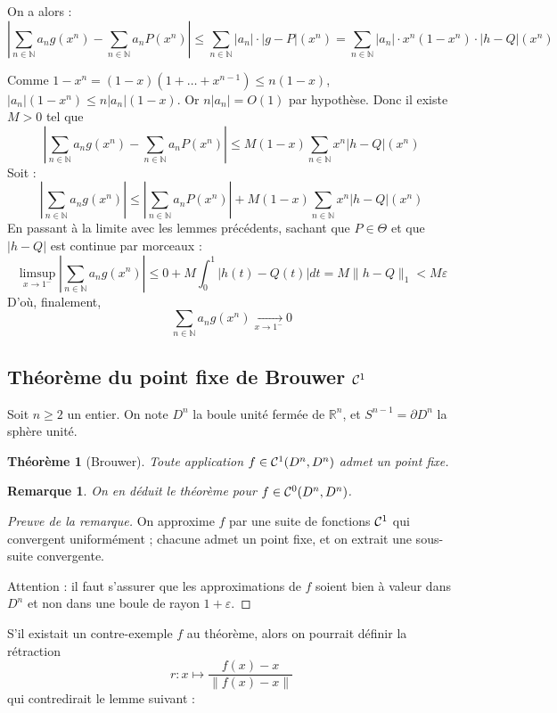 \documentclass[a4paper, 11pt]{article}
\def\N{\mathbb{N}}
\def\R{\mathbb{R}}
\def\Cf{{\cal{C}}}
\newtheorem*{theorem}{Théorème}
\newtheorem*{remark}{Remarque}
\begin{document}
On a alors :
\[ \left| \sum_{n \in \N} a_n g(x^n) - \sum_{n \in \N} a_n P(x^n) \right| \leq
  \sum_{n \in \N} |a_n| \cdot |g - P|(x^n) = \sum_{n \in \N} |a_n| \cdot
  x^n(1-x^n) \cdot |h - Q|(x^n) \]

Comme $1-x^n = (1-x)(1+ \ldots + x^{n-1}) \leq n(1-x)$, $|a_n|(1-x^n) \leq
n|a_n|(1-x)$. Or $n|a_n| = O(1)$ par hypothèse. Donc il existe $M > 0$ tel que
\[ \left| \sum_{n \in \N} a_n g(x^n) - \sum_{n \in \N} a_n P(x^n) \right| \leq
  M (1-x) \sum_{n \in \N} x^n|h - Q|(x^n) \]
Soit :
\[ \left| \sum_{n \in \N} a_n g(x^n) \right| \leq
  \left| \sum_{n \in \N} a_n P(x^n) \right| +
  M (1-x) \sum_{n \in \N} x^n|h - Q|(x^n) \]
En passant à la limite avec les lemmes précédents, sachant que $P \in \Theta$ et
que $|h-Q|$ est continue par morceaux :
\[ \limsup_{x \to 1^-} \left| \sum_{n \in \N} a_n g(x^n) \right| \leq
  0 + M \int_0^1 |h(t) - Q(t)|dt = M \|h-Q\|_1 < M\varepsilon \]
D'où, finalement,
\[ \sum_{n \in \N} a_n g(x^n) \xrightarrow[x \to 1^-]{} 0 \]

\newpage


\subsection{Théorème du point fixe de Brouwer $\Cf^1$}

Soit $n \geq 2$ un entier. On note $D^n$ la boule unité fermée de $\R^n$, et
$S^{n-1} = \partial D^n$ la sphère unité.

\begin{theorem}[Brouwer]
  Toute application $f \in \Cf^1(D^n, D^n)$ admet un point fixe.
\end{theorem}

\begin{remark}
  On en déduit le théorème pour $f \in \Cf^0(D^n, D^n)$.
\end{remark}
\begin{proof}[Preuve de la remarque]
  On approxime $f$ par une suite de fonctions $\Cf^1$ qui convergent
  uniformément ; chacune admet un point fixe, et on extrait une sous-suite
  convergente.

  Attention : il faut s'assurer que les approximations de $f$ soient bien à
  valeur dans $D^n$ et non dans une boule de rayon $1+\varepsilon$.
\end{proof}

S'il existait un contre-exemple $f$ au théorème, alors on pourrait définir la
rétraction
\[ r : x \mapsto \frac{f(x) - x}{\|f(x) - x\|}\]
qui contredirait le lemme suivant :
\end{document}
